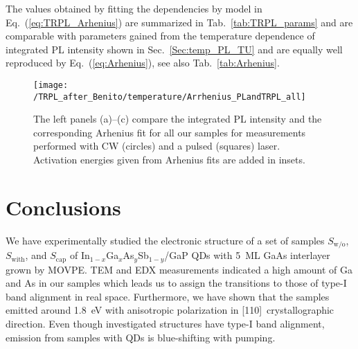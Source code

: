 {{{The values obtained by fitting the dependencies by model in Eq.~(\ref{eq:TRPL_Arhenius}) are summarized in Tab.~\ref{tab:TRPL_params} and are comparable with parameters gained from the temperature dependence of integrated PL intensity shown in Sec.~\ref{Sec:temp_PL_TU} and are equally well reproduced by Eq.~(\ref{eq:Arhenius}), see also Tab.~\ref{tab:Arhenius}.
%
\begin{figure}
	\centering
	\texttt{[image: /TRPL\_after\_Benito/temperature/Arrhenius\_PLandTRPL\_all]} %
	\caption{The left panels (a)--(c) compare the integrated PL intensity and the corresponding Arhenius fit for all our samples for measurements performed with CW (circles) and a pulsed (squares) laser. Activation energies given from Arhenius fits are added in insets.}
	\label{fig:Arrhenius_PLandTRPL}
\end{figure}


\newpage 







\section{Conclusions} \label{sec:TUB_results}
%
We have experimentally studied the electronic structure of a set of samples $S_\mathrm{w/o}$, $S_\mathrm{with}$, and $S_\mathrm{cap}$ of In$_{1-x}$Ga$_{x}$As$_y$Sb$_{1-y}$/GaP QDs with 5~ML GaAs interlayer grown by MOVPE. TEM and EDX measurements indicated a high amount of Ga and As in our samples which leads us to assign the transitions to those of type-I band alignment in real space. Furthermore, we have shown that the samples emitted around 1.8~eV with anisotropic polarization in [110]~crystallographic direction. Even though investigated structures have type-I band alignment, emission from samples with QDs is blue-shifting with pumping. %

}}}
